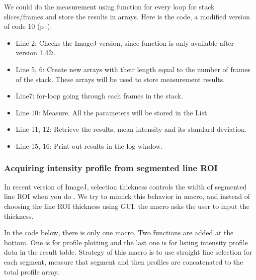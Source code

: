 We could do the measurement using  function for every loop for stack slices/frames and store the results in arrays. Here is the code, a modified version of code 10 (p~\pageref{code:10}). 



\begin{itemize}
  \item Line 2: Checks the ImageJ version, since  function is only available after version 1.42i.
  \item Line 5, 6: Create new arrays with their length equal to the number of frames of the stack. These arrays will be used to store measurement results. 
  \item Line7: for-loop going through each frames in the stack.
  \item Line 10: Measure. All the parameters will be stored in the List. 
  \item Line 11, 12: Retrieve the results, mean intensity and its standard deviation. 
  \item Line 15, 16: Print out results in the log window. 
\end{itemize}

\subsubsection{Acquiring intensity profile from segmented line ROI}
 
In recent version of ImageJ, selection thickness controls the width of segmented
line ROI when you do . We try to mimick this
behavior in macro, and instead of choosing the line ROI thickness using GUI, the
macro asks the user to input the thickness. 

In the code below, there is only one macro. Two functions are added at the
bottom. One is for profile plotting and the last one is for listing
intensity profile data in the result table. Strategy of this macro is to use
straight line selection for each segment, measure that segment and then profiles
are concatenated to the total profile array.

%
%


